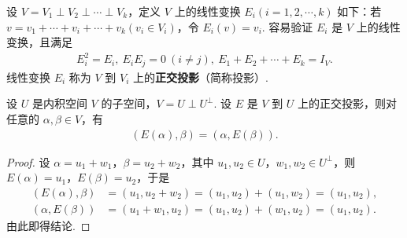 \documentclass[../../main.tex]{subfiles}
\begin{document}
\begin{definition}[正交投影]
设 $V = V_1 \perp V_2 \perp \cdots \perp V_k$，定义 $V$ 上的线性变换 $E_i (i = 1, 2, \cdots, k)$ 如下：若 $v = v_1 + \cdots + v_i + \cdots + v_k (v_i \in V_i)$，令 $E_i(v) = v_i$. 容易验证 $E_i$ 是 $V$ 上的线性变换，且满足
\begin{align*}
E_i^2 = E_i, \ E_iE_j = 0\ (i \neq j), \ E_1 + E_2 + \cdots + E_k = I_V.
\end{align*}
线性变换 $E_i$ 称为 $V$ 到 $V_i$ 上的\textbf{正交投影}（简称投影）.
\end{definition}

\begin{proposition}\label{proposition:正交投影的性质}
设 $U$ 是内积空间 $V$ 的子空间，$V = U \perp U^\perp$. 设 $E$ 是 $V$ 到 $U$ 上的正交投影，则对任意的 $\alpha, \beta \in V$，有
\begin{align*}
(E(\alpha), \beta) = (\alpha, E(\beta)).
\end{align*}
\end{proposition}
\begin{proof}
设 $\alpha = u_1 + w_1$，$\beta = u_2 + w_2$，其中 $u_1, u_2 \in U$，$w_1, w_2 \in U^\perp$，则 $E(\alpha) = u_1$，$E(\beta) = u_2$，于是
\begin{align*}
(E(\alpha), \beta) &= (u_1, u_2 + w_2) = (u_1, u_2) + (u_1, w_2) = (u_1, u_2), \\
(\alpha, E(\beta)) &= (u_1 + w_1, u_2) = (u_1, u_2) + (w_1, u_2) = (u_1, u_2).
\end{align*}
由此即得结论.

\end{proof}
\end{document}
